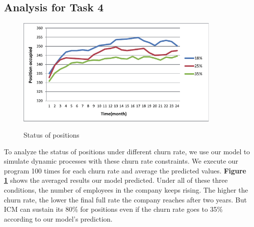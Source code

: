 \documentclass[12pt,a4paper,titlepage]{article}
\begin{document}
\subsection{Analysis for Task 4}
\label{sec:analysis-for-task-4}


\begin{figure}[htb]
  \centering
  \includegraphics[width=10cm]{task4_p.pdf}\\
  \caption{Status of positions}\label{t4_p}
\end{figure}

To analyze the status of positions under different churn rate, we use
our model to simulate dynamic processes with these churn rate
constraints. We execute our program 100 times for each churn rate and
average the predicted values. \textbf{Figure \ref{t4_p}} shows the averaged
results our model predicted. Under all of these three conditions, the
number of employees in the company keeps rising. The higher the churn
rate, the lower the final full rate the company reaches after two
years. But ICM can sustain its 80\% for positions even if the churn
rate goes to 35\% according to our model's prediction.
\end{document}
